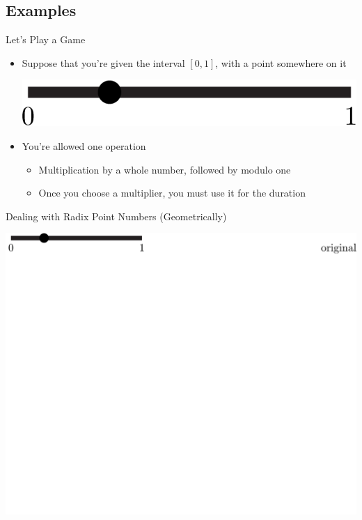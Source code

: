 \documentclass{beamer}
\begin{document}
      \subsection{Examples}
      \begin{frame}{Let's Play a Game}
        \begin{itemize}
          \item Suppose that you're given the interval $[0,1]$, with a point somewhere on it \pause
          \begin{center}
            \includegraphics{images/interval/intervalwithdot}
            \end{center} \pause
            \item You're allowed one operation
            \begin{itemize}
              \item Multiplication by a whole number, followed by modulo one
              \item Once you choose a multiplier, you must use it for the duration
            \end{itemize}
          \end{itemize}
        \end{frame}

        \begin{frame}{Dealing with Radix Point Numbers (Geometrically)}
          \begin{example}
            \includegraphics[width=\textwidth,height=0.75\textheight]{images/Binary/1}
          \end{example}
        \end{frame}
\end{document}
